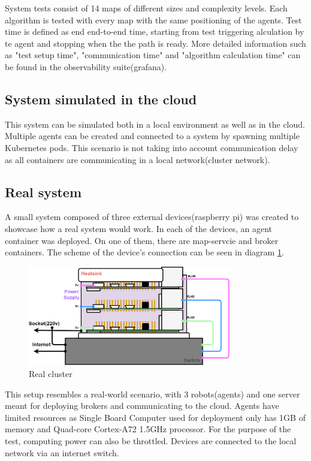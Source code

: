 System tests consist of 14 maps of different sizes and complexity levels. Each algorithm is tested with every map with the same positioning of the agents. Test time is defined as end end-to-end time, starting from test triggering alculation by te agent  and stopping when the the path is ready. More detailed information such as "test setup time", "communication time" and "algorithm calculation time" can be found in the observability suite(grafana).

\subsection{System simulated in the cloud}
This system can be simulated both in a local environment as well as in the cloud. Multiple agents can be created and connected to a system by spawning multiple Kubernetes pods. This scenario is not taking into account communication delay as all containers are communicating in a local network(cluster network).

\subsection{Real system}
A small system composed of three external devices(raspberry pi) was created to showcase how a real system would work. In each of the devices, an agent container was deployed. On one of them, there are map-servcie and broker containers. The scheme of the device's connection can be seen in diagram \ref{fig:cluster}.
\begin{figure}[H]
    \centering
    \includegraphics[width=0.8\textwidth]{pictures/cluster.png}
    \caption{ Real cluster }
    \label{fig:cluster}
\end{figure}

This setup resembles a real-world scenario, with 3 robots(agents) and one server meant for deploying brokers and communicating to the cloud. Agents have limited resources as Single Board Computer used for deployment only has 1GB of memory and Quad-core Cortex-A72 1.5GHz processor\cite{rpi_specs}. For the purpose of the test, computing power can also be throttled. Devices are connected to the local network via an internet switch. 

